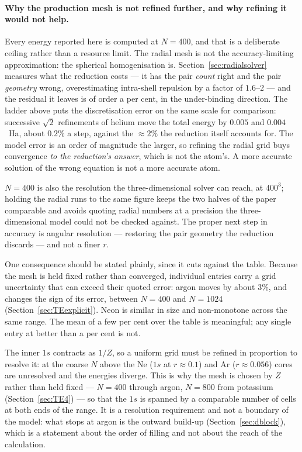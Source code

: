 \documentclass[11pt]{article}
\begin{document}
\paragraph{Why the production mesh is not refined further, and why refining it would not help.}
Every energy reported here is computed at $N=400$, and that is a deliberate ceiling rather than a
resource limit. The radial mesh is not the accuracy-limiting approximation: the spherical
homogenisation is. Section~\ref{sec:radialsolver} measures what the reduction costs --- it has the
pair \emph{count} right and the pair \emph{geometry} wrong, overestimating intra-shell repulsion by
a factor of $1.6$--$2$ --- and the residual it leaves is of order a per cent, in the under-binding
direction. The ladder above puts the discretisation error on the same scale for comparison:
successive $\sqrt2$ refinements of helium move the total energy by $0.005$ and $0.004$~Ha, about
$0.2\%$ a step, against the ${\approx}2\%$ the reduction itself accounts for. The model error is an
order of magnitude the larger, so refining the radial grid buys convergence \emph{to the
reduction's answer}, which is not the atom's. A more accurate solution of the wrong equation is not
a more accurate atom.

$N=400$ is also the resolution the three-dimensional solver can reach, at $400^3$; holding the
radial runs to the same figure keeps the two halves of the paper comparable and avoids quoting
radial numbers at a precision the three-dimensional model could not be checked against. The proper
next step in accuracy is angular resolution --- restoring the pair geometry the reduction discards
--- and not a finer $r$.

One consequence should be stated plainly, since it cuts against the table. Because the mesh is held
fixed rather than converged, individual entries carry a grid uncertainty that can exceed their
quoted error: argon moves by about $3\%$, and changes the sign of its error, between $N=400$ and
$N=1024$ (Section~\ref{sec:TEexplicit}). Neon is similar in size and non-monotone across the same
range. The mean of a few per cent over the table is meaningful; any single entry at better than a
per cent is not.

The inner $1s$ contracts as $1/Z$, so a uniform grid must be refined in proportion to
resolve it: at the coarse $N$ above the Ne ($1s$ at $r\!\approx\!0.1$) and Ar
($r\!\approx\!0.056$) cores are unresolved and the energies diverge. This is why the mesh is
chosen by $Z$ rather than held fixed --- $N=400$ through argon, $N=800$ from potassium
(Section~\ref{sec:TE4}) --- so that the $1s$ is spanned by a comparable number of cells at both
ends of the range. It is a resolution requirement and not a boundary of the model: what stops at
argon is the outward build-up (Section~\ref{sec:dblock}), which is a statement about the order of
filling and not about the reach of the calculation.
\end{document}
